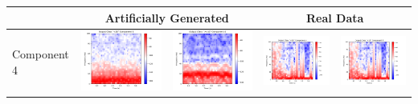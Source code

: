 \documentclass[fleqn,10pt]{wlscirep}
\begin{document}
\begin{table}[t]
 \begin{tabular}{m{2in} c c | c  c}
   \multicolumn{1}{c}{} & \multicolumn{2}{c}{\textbf{Artificially Generated}} & \multicolumn{2}{c}{\textbf{Real Data}} \\
   \toprule
   \centering
   Component 4  & \includegraphics[width=0.2\linewidth]{max_act/artificial_spec_4_0.png} & \includegraphics[width=0.2\linewidth]{max_act/artificial_spec_4_1.png} & \includegraphics[width=0.2\linewidth]{max_act/real_0_4.png} & \includegraphics[width=0.2\linewidth]{max_act/real_0_4.png}
                                                                                                                                                              
 \end{tabular}
\end{table}
\end{document}

